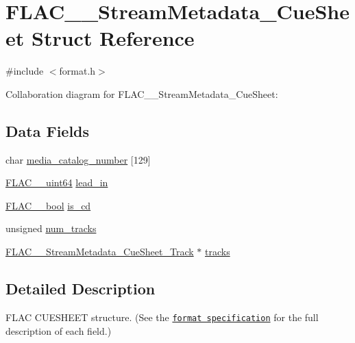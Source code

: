 \hypertarget{struct_f_l_a_c_____stream_metadata___cue_sheet}{}\section{F\+L\+A\+C\+\_\+\+\_\+\+Stream\+Metadata\+\_\+\+Cue\+Sheet Struct Reference}
\label{struct_f_l_a_c_____stream_metadata___cue_sheet}


{\ttfamily \#include $<$format.\+h$>$}



Collaboration diagram for F\+L\+A\+C\+\_\+\+\_\+\+Stream\+Metadata\+\_\+\+Cue\+Sheet\+:
\subsection*{Data Fields}
\begin{DoxyCompactItemize}
\item 
char \hyperlink{struct_f_l_a_c_____stream_metadata___cue_sheet_a776e6057ac7939fba52edecd44ec45bc}{media\+\_\+catalog\+\_\+number} \mbox{[}129\mbox{]}
\item 
\hyperlink{ordinals_8h_aa78c8c70a3eb8a58af7436f278acde8e}{F\+L\+A\+C\+\_\+\+\_\+uint64} \hyperlink{struct_f_l_a_c_____stream_metadata___cue_sheet_a43fdc0a538ef2c3e0926ee22814baf40}{lead\+\_\+in}
\item 
\hyperlink{ordinals_8h_a95103469f1cbd78b8cf250194985b34e}{F\+L\+A\+C\+\_\+\+\_\+bool} \hyperlink{struct_f_l_a_c_____stream_metadata___cue_sheet_a6af66f921aefc6f779fbc0ab6daeab8a}{is\+\_\+cd}
\item 
unsigned \hyperlink{struct_f_l_a_c_____stream_metadata___cue_sheet_a6924f26a8e8fa9023f23539b959fe2ae}{num\+\_\+tracks}
\item 
\hyperlink{struct_f_l_a_c_____stream_metadata___cue_sheet___track}{F\+L\+A\+C\+\_\+\+\_\+\+Stream\+Metadata\+\_\+\+Cue\+Sheet\+\_\+\+Track} $\ast$ \hyperlink{struct_f_l_a_c_____stream_metadata___cue_sheet_a5c0c3440b01b773684d56aeb1e424fab}{tracks}
\end{DoxyCompactItemize}


\subsection{Detailed Description}
F\+L\+AC C\+U\+E\+S\+H\+E\+ET structure. (See the \href{../format.html#metadata_block_cuesheet}{\tt format specification} for the full description of each field.) 

